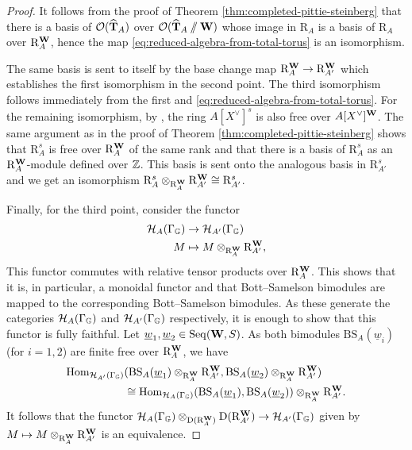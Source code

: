\documentclass[a4paper, 10pt, oneside, reqno]{amsart}
\theoremstyle{plain}
\theoremstyle{definition}
\theoremstyle{remark}
\newcommand{\Gbb}{\mathbb{G}}
\newcommand{\RR}{\mathrm{R}}
\newcommand{\BS}{\mathrm{BS}}
\newcommand{\Seq}{\mathrm{Seq}}
\begin{document}
\begin{proof}
It follows from the proof of Theorem \ref{thm:completed-pittie-steinberg} that there is a basis of $\mathcal{O}(\widehat{\mathbf{T}}_A)$ over $\mathcal{O}(\widehat{\mathbf{T}}_A\sslash \mathbf{W})$ whose image in $\RR_A$ is a basis of $\RR_A$ over $\RR_A^{\Wbf}$, hence the map \eqref{eq:reduced-algebra-from-total-torus} is an isomorphism.

 The same basis is sent to itself by the base change map $\RR_A^{\Wbf} \to \RR_{A'}^{\Wbf}$ which establishes the first isomorphism in the second point. The third isomorphism follows immediately from the first and \eqref{eq:reduced-algebra-from-total-torus}. For the remaining isomorphism, by \cite{PittieSteinberg}, the ring $A[X^{\vee}]^s$ is also free over $A[X^{\vee}]^{\mathbf{W}}$. The same argument as in the proof of Theorem \ref{thm:completed-pittie-steinberg} shows that $\RR_A^s$ is free over $\RR_A^{\Wbf}$ of the same rank and that there is a basis of $\RR_A^s$ as an $\RR_A^{\Wbf}$-module defined over $\mathbb{Z}$. This basis is sent onto the analogous basis in $\RR_{A'}^s$ and we get an isomorphism $\RR_A^s \otimes_{\RR_A^{\Wbf}} \RR_{A'}^{\Wbf} \cong \RR_{A'}^s$. 
 
Finally, for the third point, consider the functor
\begin{align*}
\Hcal_{A}(\Gamma_{\Gbb}) &\to \Hcal_{A'}(\Gamma_{\Gbb}) \\
M &\mapsto M \otimes_{\RR_A^{\Wbf}} \RR_{A'}^{\Wbf},
\end{align*}
This functor commutes with relative tensor products over $\RR_A^{\Wbf}$. This shows that it is, in particular, a monoidal functor and that Bott--Samelson bimodules are mapped to the corresponding Bott--Samelson bimodules. As these generate the categories $\Hcal_{A}(\Gamma_{\Gbb})$ and $\Hcal_{A'}(\Gamma_{\Gbb})$ respectively, it is enough to show that this functor is fully faithful. Let $\underline{w}_1, \underline{w}_2 \in \Seq(\Wbf,S)$. As both bimodules $\BS_{A}(\underline{w}_i)$ (for $i = 1,2$) are finite free over $\RR_{A}^{\Wbf}$, we have 
\begin{align*}
\Hom_{\Hcal_{A'}(\Gamma_{\Gbb})}&(\BS_A(\underline{w}_1) \otimes_{\RR_A^{\Wbf}} \RR_{A'}^{\Wbf}, \BS_A(\underline{w}_2) \otimes_{\RR_A^{\Wbf}} \RR_{A'}^{\Wbf}) \\
&\cong \Hom_{\Hcal_{A}(\Gamma_{\Gbb})}(\BS_A(\underline{w}_1), \BS_A(\underline{w}_2))\otimes_{\RR_A^{\Wbf}} \RR_{A'}^{\Wbf}.
\end{align*}
It follows that the functor $\Hcal_{A}(\Gamma_{\Gbb}) \otimes_{\DD(\RR_A^{\Wbf})} \DD(\RR_{A'}^{\Wbf}) \to \Hcal_{A'}(\Gamma_{\Gbb})$ given by $M \mapsto M \otimes_{\RR_A^{\Wbf}} \RR_{A'}^{\Wbf}$ is an equivalence.
\end{proof}
\end{document}
